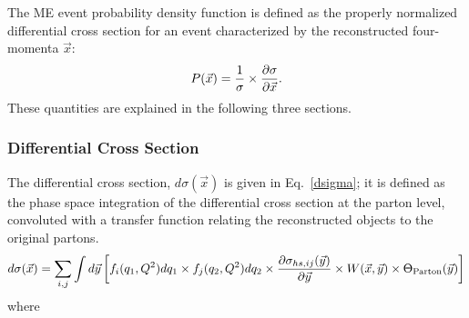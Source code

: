 The ME event probability density function is defined as the properly
normalized differential cross section for an event characterized by
the reconstructed four-momenta $\vec{x}$:
\begin{equation}
\label{px}
P(\vec{x}) = \frac{1}{\sigma} \times \frac{\partial \sigma}{\partial \vec{x}}.
\end{equation}
\noindent These quantities are explained in the following three
sections.

\subsubsection{Differential Cross Section}

The differential cross section, $d\sigma(\vec{x})$ is given in
Eq.~\ref{dsigma}; it is defined as the phase space integration of the
differential cross section at the parton level, convoluted with a
transfer function relating the reconstructed objects to the original
partons.
\begin{equation}
\label{dsigma}
d\sigma(\vec{x}) = \sum_{i,j} \int d\vec{y}
\left[ f_{i}(q_{1}, Q^{2})dq_{1}
\times f_{j}(q_{2}, Q^{2})dq_{2}
\times \frac{\partial \sigma_{hs,ij}(\vec{y})}{\partial \vec{y}}
\times W(\vec{x},\vec{y})
\times \Theta_{\rm{Parton}}(\vec{y}) \right]
\end{equation}
\noindent where
